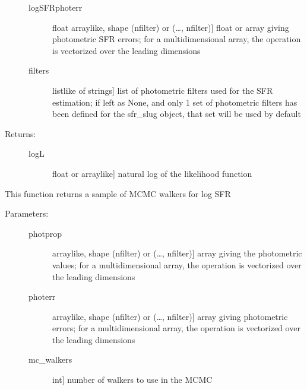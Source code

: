 \documentclass[letterpaper,10pt,english]{sphinxmanual}
\begin{document}
\begin{fulllineitems}
\begin{fulllineitems}
\begin{description}
\begin{description}
\item[{logSFRphoterr}] \leavevmode{[}float arraylike, shape (nfilter) or (…, nfilter){]}
float or array giving photometric SFR errors; for a
multidimensional array, the operation is vectorized over
the leading dimensions

\item[{filters}] \leavevmode{[}listlike of strings{]}
list of photometric filters used for the SFR estimation;
if left as None, and only 1 set of photometric filters
has been defined for the sfr\_slug object, that set will
be used by default

\end{description}

\item[{Returns:}] \leavevmode\begin{description}
\item[{logL}] \leavevmode{[}float or arraylike{]}
natural log of the likelihood function

\end{description}

\end{description}

\end{fulllineitems}


\begin{fulllineitems}
\label{\detokenize{sfr_slug:slugpy.sfr_slug.sfr_slug.mcmc}}
This function returns a sample of MCMC walkers for log SFR
\begin{description}
\item[{Parameters:}] \leavevmode\begin{description}
\item[{photprop}] \leavevmode{[}arraylike, shape (nfilter) or (…, nfilter){]}
array giving the photometric values; for a
multidimensional array, the operation is vectorized over
the leading dimensions

\item[{photerr}] \leavevmode{[}arraylike, shape (nfilter) or (…, nfilter){]}
array giving photometric errors; for a multidimensional
array, the operation is vectorized over the leading
dimensions

\item[{mc\_walkers}] \leavevmode{[}int{]}
number of walkers to use in the MCMC


\end{description}
\end{description}
\end{fulllineitems}
\end{fulllineitems}
\end{document}
